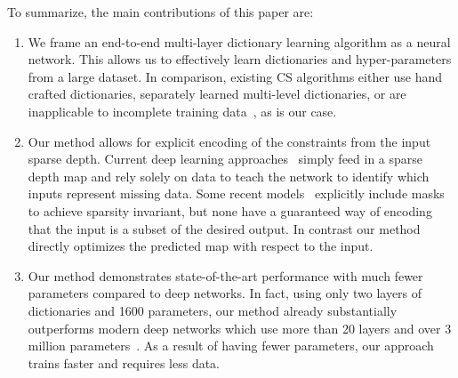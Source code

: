 To summarize, the main contributions of this paper are:
\begin{enumerate}
\item We frame an end-to-end multi-layer dictionary learning algorithm as a neural network. This allows us to effectively learn dictionaries and hyper-parameters from a large dataset. In comparison, existing CS algorithms either use hand crafted dictionaries, separately learned multi-level dictionaries, or are inapplicable to incomplete training data~\cite{sulam}, as is our case.

  
\item Our method allows for explicit encoding of the constraints from the input sparse depth. Current deep learning approaches~\cite{sparsetodense} simply feed in a sparse depth map and rely solely on data to teach the network to identify which inputs represent missing data. Some recent models~\cite{uhrig} explicitly include masks to achieve sparsity invariant, but none have a guaranteed way of encoding that the input is a subset of the desired output. In contrast our method directly optimizes the predicted map with respect to the input.
  
  
\item Our method demonstrates state-of-the-art performance with much fewer parameters compared to deep networks. In fact, using only two layers of dictionaries and 1600 parameters, our method already substantially outperforms modern deep networks which use more than 20 layers and over 3 million parameters~\cite{sparsetodense}. As a result of having fewer parameters, our approach trains faster and requires less data.
  
\end{enumerate}
  